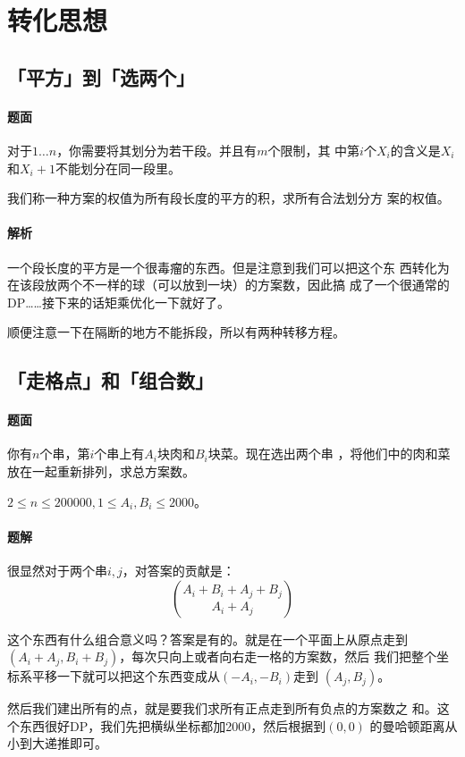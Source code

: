 \section{转化思想}

\subsection{「平方」到「选两个」}
\paragraph{题面}
对于$1\ldots n$，你需要将其划分为若干段。并且有$m$个限制，其
中第$i$个$X_i$的含义是$X_i$和$X_i+1$不能划分在同一段里。\par
我们称一种方案的权值为所有段长度的平方的积，求所有合法划分方
案的权值。
\paragraph{解析}
一个段长度的平方是一个很毒瘤的东西。但是注意到我们可以把这个东
西转化为在该段放两个不一样的球（可以放到一块）的方案数，因此搞
成了一个很通常的DP……接下来的话矩乘优化一下就好了。\par
顺便注意一下在隔断的地方不能拆段，所以有两种转移方程。

\subsection{「走格点」和「组合数」}
\paragraph{题面}
你有$n$个串，第$i$个串上有$A_i$块肉和$B_i$块菜。现在选出两个串
，将他们中的肉和菜放在一起重新排列，求总方案数。\par
$2\leq n\leq 200000, 1\leq A_i,B_i\leq 2000$。
\paragraph{题解}
很显然对于两个串$i, j$，对答案的贡献是：
\[\binom{A_i + B_i + A_j + B_j}{A_i + A_j}\]\par
这个东西有什么组合意义吗？答案是有的。就是在一个平面上从原点走到
$(A_i + A_j, B_i + B_j)$，每次只向上或者向右走一格的方案数，然后
我们把整个坐标系平移一下就可以把这个东西变成从$(-A_i, -B_i)$走到
$(A_j, B_j)$。\par
然后我们建出所有的点，就是要我们求所有正点走到所有负点的方案数之
和。这个东西很好DP，我们先把横纵坐标都加2000，然后根据到$(0, 0)$
的曼哈顿距离从小到大递推即可。

